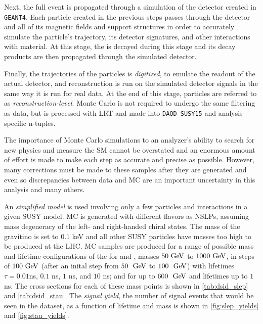 Next, the full event is propagated through a simulation of the detector created in \texttt{GEANT4}. Each particle created in the previous steps passes through the detector and all of its magnetic fields and support structures in order to accurately simulate the particle's trajectory, its detector signatures, and other interactions with material. At this stage, the \slep is decayed during this stage and its decay products are then propagated through the simulated detector. 

Finally, the trajectories of the particles is \emph{digitized}, to emulate the readout of the actual detector, and reconstruction is run on the simulated detector signals in the same way it is run for real data. At the end of this stage, particles are referred to as \emph{reconstruction-level}. Monte Carlo is not required to undergo the same filtering as data, but is processed with \ac{LRT} and made into \texttt{DAOD\_SUSY15} and analysis-specific n-tuples.  

The importance of Monte Carlo simulations to an analyzer's ability to search for new physics and measure the \ac{SM} cannot be overstated and an enormous amount of effort is made to make each step as accurate and precise as possible. However, many corrections must be made to these samples after they are generated and even so discrepancies between data and \ac{MC} are an important uncertainty in this analysis and many others.

An \emph{simplified model} is used involving only a few particles and interactions in a given \ac{SUSY} model. \ac{MC} is generated with different \slep flavors as \acp{NSLP}, assuming mass degeneracy of the left- and right-handed chiral states. The mass of the gravitino is set to 0.1 keV and all other \ac{SUSY} particles have masses too high to be produced at the \ac{LHC}. \ac{MC} samples are produced for a range of possible mass and lifetime configurations of the \slep for \selec and \smu, masses $50 \GeV$ to $1000 \GeV$, in steps of $100 \GeV$ (after an inital step from $50~\GeV$ to $100~\GeV$) with lifetimes $\tau = 0.01$ns, $0.1$ ns, $1$ ns, and $10$ ns; and for \stau up to $600~\GeV$ and lifetimes up to $1$ ns.  The cross sections for each of these mass points is shown in \autoref{tab:dsid_slep} and \autoref{tab:dsid_stau}. The \emph{signal yield}, the number of signal events that would be seen in the dataset, as a function of \slep lifetime and mass is shown in \autoref{fig:slep_yields} and \autoref{fig:stau_yields}.

